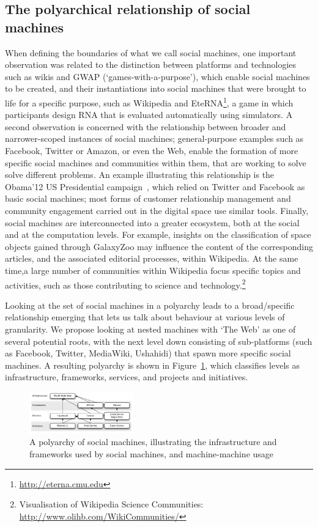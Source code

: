 \documentclass{www13-companion-accepted}
\begin{document}
\subsection{The polyarchical relationship of social machines}
When defining the boundaries of what we call social machines, one important observation was related to the distinction between platforms and technologies such as wikis and GWAP (`games-with-a-purpose'), which enable social machines to be created, and their instantiations into social machines that were brought to life for a specific purpose, such as Wikipedia and EteRNA\footnote{\url{http://eterna.cmu.edu}}, a game in which participants design RNA that is evaluated automatically using simulators. A second observation is concerned with the relationship between broader and narrower-scoped instances of social machines; general-purpose examples such as Facebook, Twitter or Amazon, or even the Web, enable the formation of more specific social machines and communities within them, that are working to solve solve different problems. An example illustrating this relationship is the Obama'12 US Presidential campaign~\cite{obamakieron}, which relied on Twitter and Facebook as basic social machines; most forms of customer relationship management and community engagement carried out in the digital space use similar tools. Finally, social machines are interconnected into a greater ecosystem, both at the social and at the computation levels. For example, insights on the classification of space objects gained through GalaxyZoo may influence the content of the corresponding articles, and the associated editorial processes, within Wikipedia. At the same time,a large number of communities within Wikipedia focus specific topics and activities, such as those contributing to science and technology.\footnote{Visualisation of Wikipedia Science Communities: \url{http://www.olihb.com/WikiCommunities/}}

Looking at the set of social machines in a polyarchy leads to a broad/specific relationship emerging that lets us talk about behaviour at various levels of granularity. We propose looking at nested machines with `The Web' as one of several potential roots, with the next level down consisting of sub-platforms (such as Facebook, Twitter, MediaWiki, Ushahidi) that spawn more specific social machines. A resulting polyarchy is shown in Figure~\ref{polyarchy}, which classifies levels as infrastructure, frameworks, services, and projects and initiatives.

\begin{figure}[htb]
\begin{center}
\includegraphics[width=0.4\textwidth]{img/polyarchy}
\caption{A polyarchy of social machines, illustrating the infrastructure and frameworks used by social machines, and machine-machine usage} \label{polyarchy}
\end{center}
\end{figure}
\end{document}
